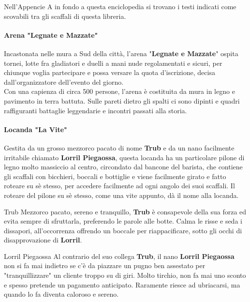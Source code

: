 \documentclass[10pt,twoside,onecolumn,openany]{book}
\begin{document}
Nell'Appencie A in fondo a questa enciclopedia si trovano i testi indicati come scovabili tra gli scaffali di questa libreria.\\
\newpage
\paragraph{Arena "Legnate e Mazzate"}
Incastonata nelle mura a Sud della città, l'arena "\textbf{Legnate e Mazzate}" ospita tornei, lotte fra gladiatori e duelli a mani nude regolamentati e sicuri, per chiunque voglia partecipare e possa versare la quota d'iscrizione, decisa dall'organizzatore dell'evento del giorno.\\
Con una capienza di circa 500 persone, l'arena è costituita da mura in legno e pavimento in terra battuta. Sulle pareti dietro gli spalti ci sono dipinti e quadri raffiguranti battaglie leggendarie e incontri passati alla storia.\\
\paragraph{Locanda "La Vite"}
Gestita da un grosso mezzorco pacato di nome \textbf{Trub} e da un nano facilmente irritabile chiamato \textbf{Lorril Piegaossa}, questa locanda ha un particolare pilone di legno molto massiccio al centro, circondato dal bancone del barista, che contiene gli scaffali con bicchieri, boccali e bottiglie e viene facilmente girato e fatto roteare su sè stesso, per accedere facilmente ad ogni angolo dei suoi scaffali. Il roteare del pilone su sè stesso, come una vite appunto, dà il nome alla locanda.\\
\begin{multicols}{2}
\begin{paperbox}{{Trub}}
	Mezzorco pacato, sereno e tranquillo, \textbf{Trub} è consapevole della sua forza ed evita sempre di sfruttarla, preferendo le parole alle botte. Calma le risse e seda i dissapori, all'occorrenza offrendo un boccale per riappacificare, sotto gli occhi di disapprovazione di \textbf{Lorril}.
\end{paperbox}
\columnbreak
\begin{paperbox}{{Lorril Piegaossa}}
	Al contrario del suo collega \textbf{Trub}, il nano \textbf{Lorril Piegaossa} non si fa mai indietro se c'è da piazzare un pugno ben assestato per "tranquillizzare" un cliente troppo su di giri. Molto tirchio, non fa mai uno sconto e spesso pretende un pagamento anticipato. Raramente riesce ad ubriacarsi, ma quando lo fa diventa caloroso e sereno.
\end{paperbox}
\end{multicols}
\end{document}
